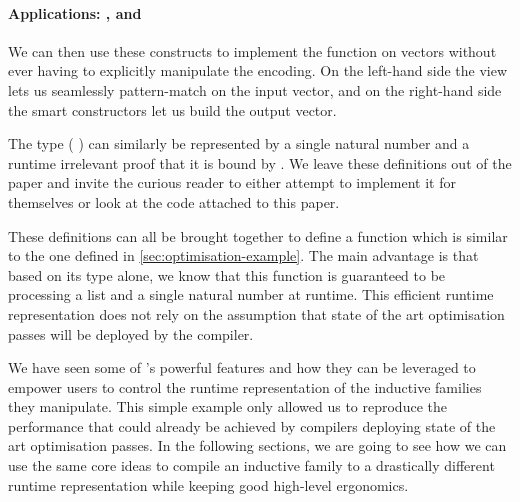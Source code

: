 \paragraph{Applications: , and }
We can then use these constructs to implement the function 
on vectors without ever having to explicitly manipulate the encoding.
%
On the left-hand side the view lets us seamlessly pattern-match on the input
vector, and on the right-hand side the smart constructors let us build the
output vector.


The type ( ) can similarly be represented by a
single natural number and a runtime irrelevant proof that it is bound by
.
%
We leave these definitions out of the paper and invite the curious reader
to either attempt to implement it for themselves or look at the code attached
to this paper.

These definitions can all be brought together to define a 
function which is  similar to the one defined in \cref{sec:optimisation-example}.
%
The main advantage is that based on its type alone, we know that this function
is guaranteed to be processing a list and a single natural number at runtime.
%
This efficient runtime representation does not rely on the assumption that state
of the art optimisation passes will be deployed by the compiler.



We have seen some of \idris{}'s powerful features and how they can be leveraged
to empower users to control the runtime representation of the inductive families
they manipulate.
%
This simple example only allowed us to reproduce the performance that could already
be achieved by compilers deploying state of the art optimisation passes.
%
In the following sections, we are going to see how we can use the same core ideas
to compile an inductive family to a drastically different runtime representation
while keeping good high-level ergonomics.

